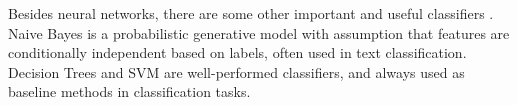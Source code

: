Besides neural networks, there are some other important and useful classifiers
\cite{wu2008top} . Naive Bayes is a probabilistic generative model with assumption
that features are conditionally independent based on labels,  often used in text
classification. Decision Trees and SVM are well-performed classifiers, and
always used as baseline methods in classification tasks.



